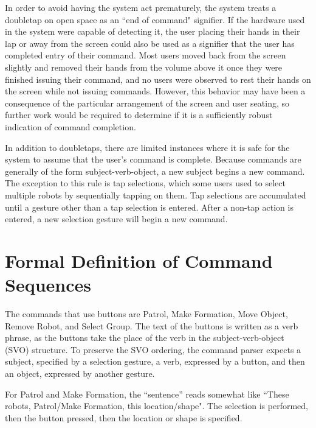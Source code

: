 In order to avoid having the system act prematurely, the system treats a doubletap on open space as an ``end of command" signifier.
If the hardware used in the system were capable of detecting it, the user placing their hands in their lap or away from the screen could also be used as a signifier that the user has completed entry of their command. 
Most users moved back from the screen slightly and removed their hands from the volume above it once they were finished issuing their command, and no users were observed to rest their hands on the screen while not issuing commands. 
However, this behavior may have been a consequence of the particular arrangement of the screen and user seating, so further work would be required to determine if it is a sufficiently robust indication of command completion. 

In addition to doubletaps, there are limited instances where it is safe for the system to assume that the user's command is complete. 
Because commands are generally of the form subject-verb-object, a new subject begins a new command. 
The exception to this rule is tap selections, which some users used to select multiple robots by sequentially tapping on them. 
Tap selections are accumulated until a gesture other than a tap selection is entered.
After a non-tap action is entered, a new selection gesture will begin a new command. 

\section{Formal Definition of Command Sequences}

The commands that use buttons are Patrol, Make Formation, Move Object, Remove Robot, and Select Group. 
The text of the buttons is written as a verb phrase, as the buttons take the place of the verb in the subject-verb-object (SVO) structure. 
To preserve the SVO ordering, the command parser expects a subject, specified by a selection gesture, a verb, expressed by a button, and then an object, expressed by another gesture. 

For Patrol and Make Formation, the ``sentence'' reads somewhat like ``These robots, Patrol/Make Formation, this location/shape". 
The selection is performed, then the button pressed, then the location or shape is specified. 

